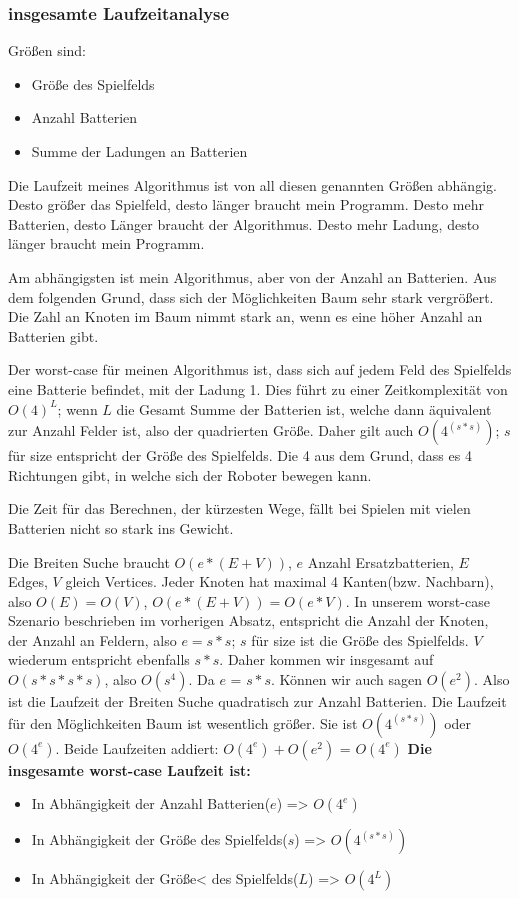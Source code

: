 \documentclass[a4paper,12pt,arial]{scrartcl}
\begin{document}
\subsubsection{insgesamte Laufzeitanalyse}
Größen sind:
\begin{itemize}
    \item Größe des Spielfelds
    \item Anzahl Batterien
    \item Summe der Ladungen an Batterien
\end{itemize}

Die Laufzeit meines Algorithmus ist von all diesen genannten Größen abhängig.
Desto größer das Spielfeld, desto länger braucht mein Programm.
Desto mehr Batterien, desto Länger braucht der Algorithmus.
Desto mehr Ladung, desto länger braucht mein Programm.
\par
Am abhängigsten ist mein Algorithmus, aber von der Anzahl an Batterien. Aus dem folgenden Grund, dass sich der Möglichkeiten Baum sehr stark vergrößert.
Die Zahl an Knoten im Baum nimmt stark an, wenn es eine höher Anzahl an Batterien gibt.
\par
Der worst-case für meinen Algorithmus ist, dass sich auf jedem Feld des Spielfelds eine Batterie befindet, mit der Ladung 1. Dies führt zu einer Zeitkomplexität von $O(4)^L$; wenn $L$ die Gesamt Summe der Batterien ist, welche dann äquivalent zur Anzahl Felder ist, also der quadrierten Größe. Daher gilt auch $O(4^(s*s))$; $s$für size entspricht der Größe des Spielfelds.
Die 4 aus dem Grund, dass es 4 Richtungen gibt, in welche sich der Roboter bewegen kann.
\par
Die Zeit für das Berechnen, der kürzesten Wege, fällt bei Spielen mit vielen Batterien nicht so stark ins Gewicht.\par
Die Breiten Suche braucht $O(e * (E + V))$, $e$ Anzahl Ersatzbatterien, $E$ Edges, $V$ gleich Vertices. Jeder Knoten hat maximal 4 Kanten(bzw. Nachbarn), also $O(E) = O(V)$, $O(e * (E+V)) = O(e * V)$. In unserem worst-case Szenario beschrieben im vorherigen Absatz, entspricht die Anzahl der Knoten, der Anzahl an Feldern, also $e=s*s$; $s$ für size ist die Größe des Spielfelds.
$V$ wiederum entspricht ebenfalls $s*s$. Daher kommen wir insgesamt auf $O(s*s*s*s)$,
also $O(s^4)$. Da $e$ = $s * s$. Können wir auch sagen $O(e^2)$. Also ist die Laufzeit der Breiten Suche quadratisch zur Anzahl Batterien.
Die Laufzeit für den Möglichkeiten Baum ist wesentlich größer.
Sie ist $O(4^(s*s))$ oder $O(4^e)$.
Beide Laufzeiten addiert: $O(4^e) + O(e^2)$ = $O(4^e)$
\textbf{Die insgesamte worst-case Laufzeit ist:}
\begin{itemize}
\item In Abhängigkeit der Anzahl Batterien($e$) => \texttt{$O(4^e)$} \\
\item In Abhängigkeit der Größe des Spielfelds($s$) => \texttt{$O(4^(s*s))$}
\item In Abhängigkeit der Größe< des Spielfelds($L$) => \texttt{$O(4^L)$}
\end{itemize}
\end{document}
